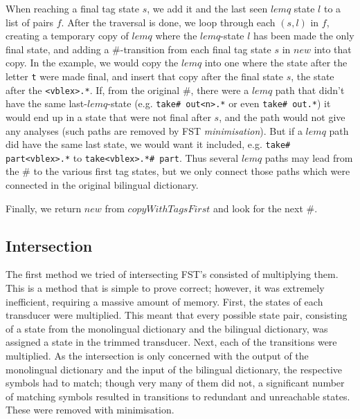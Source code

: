 \documentclass[10pt, a4paper]{article}
\newcommand{\ana}[1]{\texttt{#1}}
\begin{document}
When reaching a final tag state $s$, we add it and the last seen
$lemq$ state $l$ to a list of pairs $f$. After the traversal is done,
we loop through each $(s,l)$ in $f$, creating a temporary copy of
$lemq$ where the $lemq$-state $l$ has been made the only final state,
and adding a \#-transition from each final tag state $s$ in $new$ into
that copy. In the example, we would copy the $lemq$ into one where the
state after the letter \ana{t} were made final, and insert that copy
after the final state $s$, the state after the \ana{<vblex>.*}. If,
from the original \#, there were a $lemq$ path that didn't have the
same last-$lemq$-state (e.g. \ana{take\# out<n>.*} or even \ana{take\#
out.*}) it would end up in a state that were not final after $s$, and
the path would not give any analyses (such paths are removed by FST
\emph{minimisation}). But if a $lemq$ path did have the same last
state, we would want it included, e.g. \ana{take\# part<vblex>.*} to
\ana{take<vblex>.*\# part}. Thus several $lemq$ paths may lead from
the \# to the various first tag states, but we only connect those
paths which were connected in the original bilingual dictionary.

Finally, we return $new$ from $copyWithTagsFirst$ and look for the
next \#.

\subsection{Intersection}


The first method we tried of intersecting FST's consisted of
multiplying them. This is a method that is simple to prove correct;
however, it was extremely inefficient, requiring a massive amount of
memory. First, the states of each transducer were multiplied. This
meant that every possible state pair, consisting of a state from the
monolingual dictionary and the bilingual dictionary, was assigned a
state in the trimmed transducer. Next, each of the transitions were
multiplied. As the intersection is only concerned with the output of
the monolingual dictionary and the input of the bilingual dictionary,
the respective symbols had to match; though very many of them did not,
a significant number of matching symbols resulted in transitions to
redundant and unreachable states. These were removed with
minimisation.
\end{document}
